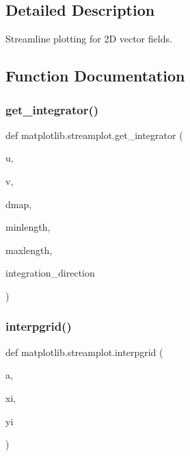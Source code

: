 \subsection{Detailed Description}
\begin{DoxyVerb}Streamline plotting for 2D vector fields.\end{DoxyVerb}
 

\subsection{Function Documentation}
\mbox{\label{namespacematplotlib_1_1streamplot_ab25ae2ba512a6686fe92afdfb33ee89c}} 
\subsubsection{\texorpdfstring{get\+\_\+integrator()}{get\_integrator()}}
{\footnotesize\ttfamily def matplotlib.\+streamplot.\+get\+\_\+integrator (\begin{DoxyParamCaption}\item[{}]{u,  }\item[{}]{v,  }\item[{}]{dmap,  }\item[{}]{minlength,  }\item[{}]{maxlength,  }\item[{}]{integration\+\_\+direction }\end{DoxyParamCaption})}

\mbox{\label{namespacematplotlib_1_1streamplot_a670940257c94db8f5dd662775e239ef8}} 
\subsubsection{\texorpdfstring{interpgrid()}{interpgrid()}}
{\footnotesize\ttfamily def matplotlib.\+streamplot.\+interpgrid (\begin{DoxyParamCaption}\item[{}]{a,  }\item[{}]{xi,  }\item[{}]{yi }\end{DoxyParamCaption})}

